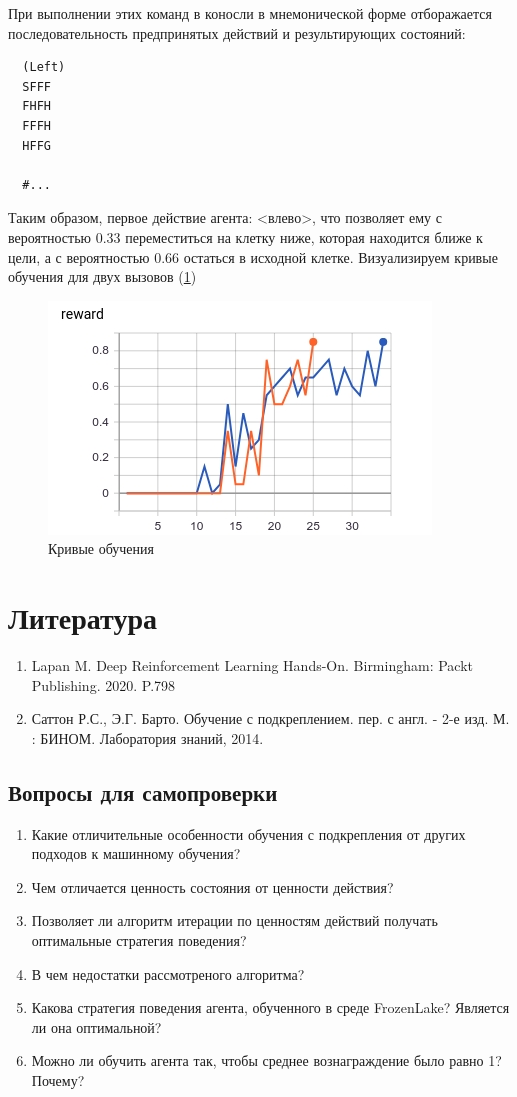 \documentclass[fleqn, a4paper, 14pt]{article}
\begin{document}
При выполнении этих команд в коносли в мнемонической форме отборажается последовательность предпринятых действий и результирующих состояний:
\begin{lstlisting}
  (Left)
  SFFF
  FHFH
  FFFH
  HFFG
  
  #...
\end{lstlisting}
Таким образом, первое действие агента: <влево>, что позволяет ему с вероятностью 0.33  переместиться на клетку ниже, которая находится ближе к цели, а с вероятностью 0.66 остаться в исходной клетке.
Визуализируем кривые обучения для двух вызовов (\figurename \ref{fig:curves})
\begin{figure}[h]
	\centering
	\includegraphics[scale=1]{curves}
	\caption{Кривые обучения}
	\label{fig:curves}
\end{figure}
 
	\section{Литература}
	\begin{enumerate}
	\item Lapan M. Deep Reinforcement Learning Hands-On. Birmingham: Packt Publishing. 2020. P.798 
	\item Саттон Р.С., Э.Г. Барто. Обучение с подкреплением. пер. с англ. - 2-е изд. М. : БИНОМ. Лаборатория знаний, 2014.
	\end{enumerate}
	\subsection{Вопросы для самопроверки}
	\begin{enumerate}
		\item Какие отличительные особенности обучения с подкрепления от других подходов к машинному обучения?
		\item Чем отличается ценность состояния от ценности действия?
		\item Позволяет ли алгоритм итерации по ценностям действий получать оптимальные стратегия поведения? 
		\item В чем недостатки рассмотреного алгоритма?
		\item Какова стратегия поведения агента, обученного в среде FrozenLake? Является ли она оптимальной?
		\item Можно ли обучить агента так, чтобы среднее вознаграждение было равно 1? Почему?
		
	\end{enumerate}
\end{document}
